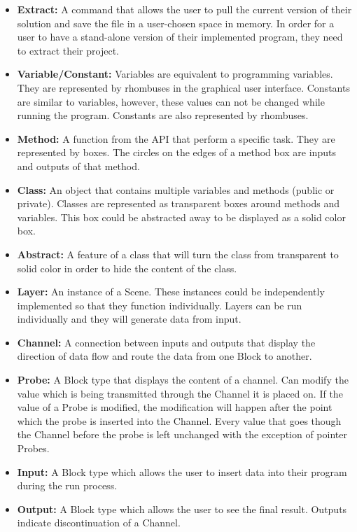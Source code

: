 \documentclass[journal,10pt,onecolumn,compsoc]{IEEEtran} \usepackage[margin=1.0in]{geometry} \usepackage{pdfpages}
\begin{document}
\begin{itemize}
	\item \textbf{Extract:}
		A command that allows the user to pull the current version of their solution and save the file in a user-chosen space in memory.
		In order for a user to have a stand-alone version of their implemented program, they need to extract their project.\\
	\item \textbf{Variable/Constant:}
		Variables are equivalent to programming variables. They are represented by rhombuses in the graphical user interface.
		Constants are similar to  variables, however, these values can not be changed while running the program.
		Constants are also represented by rhombuses.\\
	\item \textbf{Method:}
		A function from the API that perform a specific task. They are represented by boxes.
		The circles on the edges of a method box are inputs and outputs of that method.\\
	\item \textbf{Class:} 
		An object that contains multiple variables and methods (public or private).
		Classes are represented as transparent boxes around methods and variables. This box could be abstracted away to be displayed as a solid color box.\\
	\item \textbf{Abstract:}
		A feature of a class that will turn the class from transparent to solid color in order to hide the content of the class.\\
	\item \textbf{Layer:} 
		An instance of a Scene. 
		These instances could be independently implemented so that they function individually.
		Layers can be run individually and they will generate data from input.\\
	\item \textbf{Channel:}
		 A connection between inputs and outputs that display the direction of data flow and route the data from one Block to another.\\
	\item \textbf{Probe:}
		A Block type that displays the content of a channel.
		Can modify the value which is being transmitted through the Channel it is placed on.
		If the value of a Probe is modified, the modification will happen after the point which the probe is inserted into the Channel.
		Every value that goes though the Channel before the probe is left unchanged with the exception of pointer Probes.\\
	\item \textbf{Input:}
		A Block type which allows the user to insert data into their program during the run process.\\
	\item \textbf{Output:}
		A Block type which allows the user to see the final result. Outputs indicate discontinuation of a Channel.\\
\end{itemize}
\newpage
\end{document}
